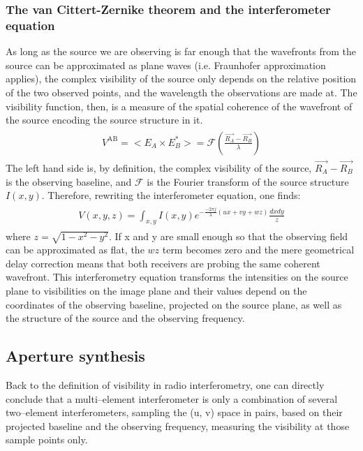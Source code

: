 \documentclass[paper=a4, fontsize=11pt]{scrartcl} %
\numberwithin{equation}{section} %
\numberwithin{figure}{section} %
\numberwithin{table}{section} %
\begin{document}
\subsubsection*{The van Cittert-Zernike theorem and the interferometer equation}
As long as the source we are observing is far enough that the wavefronts from the source can be approximated as plane waves (i.e. Fraunhofer approximation applies), the complex visibility of the source only depends on the relative position of the two observed points, and the wavelength the observations are made at. The visibility function, then, is a measure of the spatial coherence of the wavefront of the source encoding the source structure in it.
\begin{align} 
\begin{split}
\label{eq:vC-Z}
V^\mathrm{AB} = <E_A \times E_B^*> = \mathcal{F}(\frac{\vec{R_A} - \vec{R_B}}{\lambda})
\end{split}                    
\end{align}
The left hand side is, by definition, the complex visibility of the source, $\vec{R_A} - \vec{R_B}$ is the observing baseline, and $\mathcal{F}$ is the Fourier transform of the source structure $I(x, y)$. Therefore, rewriting the interferometer equation, one finds:
\begin{align} 
\begin{split}
\label{eq:InterferometerEq}
V(x,y,z) = \int_{x,y} I(x, y) e^{-\frac{-2\pi j}{\lambda}(ux+vy+wz)} \frac{dx dy}{z}
\end{split}                    
\end{align}
where $z=\sqrt{1-x^2-y^2}$. If x and y are small enough so that the observing field can be approximated as flat, the $wz$ term becomes zero and the mere geometrical delay correction means that both receivers are probing the same coherent wavefront. This interferometry equation transforms the intensities on the source plane to visibilities on the image plane and their values depend on the coordinates of the observing baseline, projected on the source plane, as well as the structure of the source and the observing frequency. 

\subsection{Aperture synthesis}
Back to the definition of visibility in radio interferometry, one can directly conclude that a multi--element interferometer is only a combination of several two--element interferometers, sampling the (u, v) space in pairs, based on their projected baseline and the observing frequency, measuring the visibility at those sample points only. 
\end{document}

